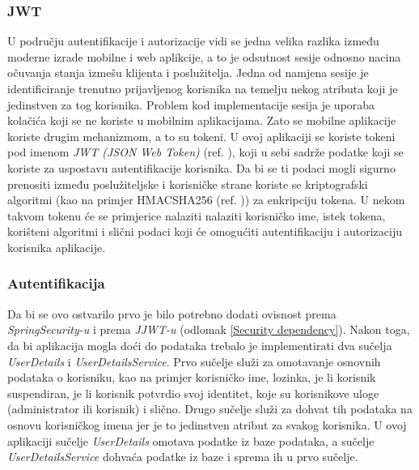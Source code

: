 \documentclass[times, utf8, zavrsni]{fer}
\begin{document}
\subsubsection{JWT}
U području autentifikacije i autorizacije vidi se jedna velika razlika između
moderne izrade mobilne i web aplikcije, a to je odsutnost sesije odnosno nacina očuvanja stanja izmešu klijenta i poslužitelja. Jedna od namjena sesije je
identificiranje trenutno prijavljenog korisnika na temelju nekog atributa koji je jedinstven za tog korisnika.
Problem kod implementacije sesija je uporaba kolačića koji se ne koriste u mobilnim aplikacijama.
Zato se mobilne aplikacije koriste drugim mehanizmom, a
to su tokeni. U ovoj aplikaciji se koriste tokeni pod imenom \textit{JWT (JSON Web Token)} (ref. \cite{jwt}), koji
u sebi sadrže podatke koji se koriste za uspostavu autentifikacije korisnika. Da bi se ti podaci
mogli sigurno prenositi između poslužiteljske i korisničke strane koriste se
kriptografski algoritmi (kao na primjer HMACSHA256 (ref. \cite{HMAC})) za enkripciju tokena.
U nekom takvom tokenu će se primjerice nalaziti nalaziti korisničko ime, istek tokena, korišteni algoritmi i slični podaci koji će omogućiti
autentifikaciju i autorizaciju korisnika aplikacije.

\subsubsection{Autentifikacija}
Da bi se ovo ostvarilo prvo je bilo potrebno dodati ovisnost prema \linebreak
\textit{SpringSecurity-u} i prema \textit{JJWT-u} (odlomak \ref{Security dependency}). Nakon toga, da bi aplikacija mogla doći do podataka trebalo je implementirati dva sučelja
\textit{UserDetails} i \textit{UserDetailsService}. Prvo sučelje služi za omotavanje osnovnih podataka o korisniku,
kao na primjer korisničko ime, lozinka, je li korisnik suspendiran, je li korisnik potvrdio svoj identitet,
koje su korisnikove uloge (administrator ili korisnik) i slično.
Drugo sučelje služi za dohvat tih podataka na osnovu korisničkog imena jer je to jedinstven atribut za svakog korisnika.
U ovoj aplikaciji sučelje \textit{UserDetails} omotava
podatke iz baze podataka, a sučelje \textit{UserDetailsService} dohvaća podatke iz baze i sprema ih u prvo sučelje.
\end{document}
